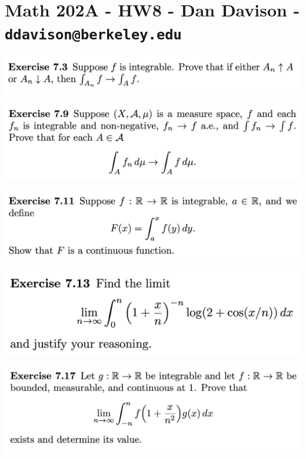 \section*{Math 202A - HW8 - Dan Davison - \texttt{ddavison@berkeley.edu}}

\begin{mdframed}
\includegraphics[width=400pt]{img/analysis--berkeley-202a-hw08-2798.png}
\end{mdframed}


\begin{mdframed}
\includegraphics[width=400pt]{img/analysis--berkeley-202a-hw08-3203.png}
\end{mdframed}


\begin{mdframed}
\includegraphics[width=400pt]{img/analysis--berkeley-202a-hw08-d0c0.png}
\end{mdframed}

\begin{mdframed}
\includegraphics[width=400pt]{img/analysis--berkeley-202a-hw08-9931.png}
\end{mdframed}


\begin{mdframed}
\includegraphics[width=400pt]{img/analysis--berkeley-202a-hw08-6e60.png}
\end{mdframed}


